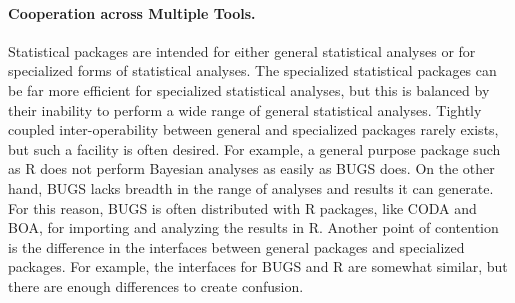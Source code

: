 \documentclass{article}
\begin{document}

\paragraph{Cooperation across Multiple Tools.}
\label{sec:multiple-tools}

Statistical packages are intended for either general
statistical analyses or for specialized forms of statistical analyses.
The specialized statistical packages can be far more efficient for
specialized statistical analyses, but this is balanced by their inability
to perform a wide range of general statistical analyses.  Tightly coupled
inter-operability between general and specialized packages rarely exists,
but such a facility is often desired.  For example, a general purpose
package such as R does not perform Bayesian analyses as easily as BUGS does.
On the other hand, BUGS lacks breadth in the range of analyses and results
it can generate.  For this reason, BUGS is often distributed with R packages,
like CODA and BOA, for importing and analyzing the results in R.  Another
point of contention is the difference in the interfaces between general
packages and specialized packages.  For example, the interfaces for BUGS
and R are somewhat similar, but there are enough differences to create confusion.
\end{document}
